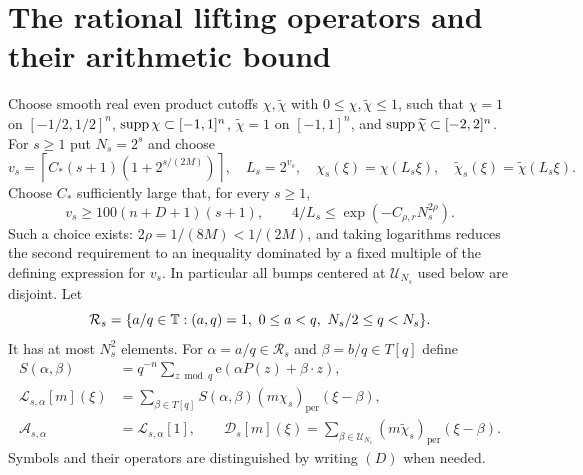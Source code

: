 \documentclass[11pt,oneside]{article}
\theoremstyle{definition}\newtheorem{definition}[theorem]{Definition}
\theoremstyle{remark}\newtheorem{remark}[theorem]{Remark}
\newcommand{\ee}[1]{\mathrm e\!\left(#1\right)}
\newcommand{\Lift}{\mathcal L}\newcommand{\Aop}{\mathcal A}\newcommand{\Dop}{\mathcal D}
\begin{document}
\section{The rational lifting operators and their arithmetic bound}\label{sec:lifting}
Choose smooth real even product cutoffs $\chi,\widetilde\chi$ with
$0\leq\chi,\widetilde\chi\leq1$, such that
$\chi=1$ on $[-1/2,1/2]^n$, $\operatorname{supp}\chi\subset[-1,1]^n$,
$\widetilde\chi=1$ on $[-1,1]^n$, and
$\operatorname{supp}\widetilde\chi\subset[-2,2]^n$.
For $s\geq1$ put $N_s=2^s$ and choose
\begin{equation}\label{eq:vs}
 v_s=\left\lceil C_*(s+1)(1+2^{s/(2M)})\right\rceil,
 \quad L_s=2^{v_s},\quad
 \chi_s(\xi)=\chi(L_s\xi),\quad
 \widetilde\chi_s(\xi)=\widetilde\chi(L_s\xi).
\end{equation}
Choose $C_*$ sufficiently large that, for every $s\geq1$,
\begin{equation}\label{eq:scalerequirements}
 v_s\geq100(n+D+1)(s+1),\qquad
 4/L_s\leq\exp(-C_{\rho,r}N_s^{2\rho}).
\end{equation}
Such a choice exists: $2\rho=1/(8M)<1/(2M)$, and taking logarithms reduces
the second requirement to an inequality dominated by a fixed multiple of
the defining expression for $v_s$. In particular all bumps centered at
$\mathcal U_{N_s}$ used below are disjoint.
Let
\[
 \mathcal R_s=\{a/q\in\mathbb T:(a,q)=1,\ 0\leq a<q,\ N_s/2\leq q<N_s\}.
\]
It has at most $N_s^2$ elements. For $\alpha=a/q\in\mathcal R_s$ and
$\beta=b/q\in T[q]$ define
\begin{align}
 S(\alpha,\beta)&=q^{-n}\sum_{z\bmod q}\ee{\alpha P(z)+\beta\cdot z},\label{eq:Gaussdef}\\
 \Lift_{s,\alpha}[m](\xi)
   &=\sum_{\beta\in T[q]}S(\alpha,\beta)
                        (m\chi_s)_{\mathrm{per}}(\xi-\beta),\label{eq:Liftdef}\\
 \Aop_{s,\alpha}&=\Lift_{s,\alpha}[1],\qquad
 \Dop_s[m](\xi)=\sum_{\beta\in\mathcal U_{N_s}}
                    (m\widetilde\chi_s)_{\mathrm{per}}(\xi-\beta).
\end{align}
Symbols and their operators are distinguished by writing $(D)$ when needed.
\end{document}
